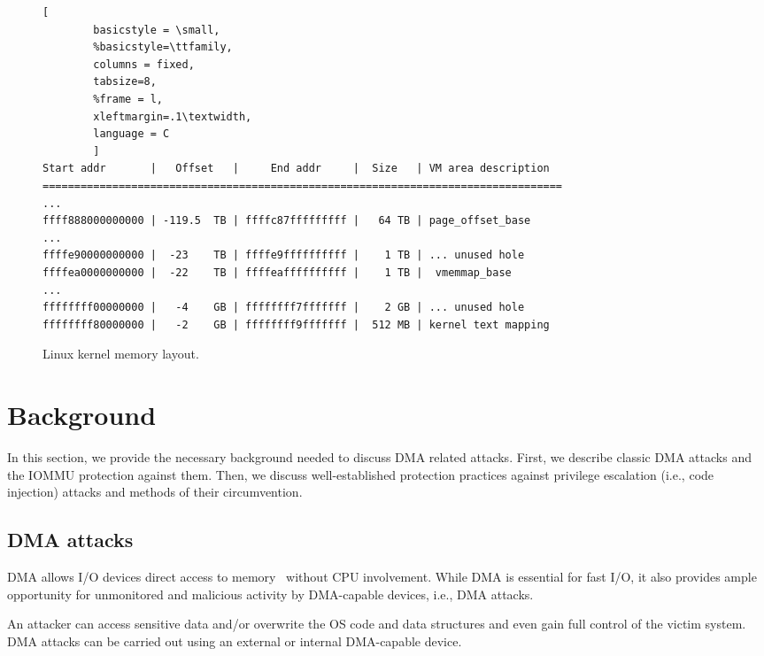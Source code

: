 \begin{figure*}[t]

        \begin{lstlisting}[
        basicstyle = \small,
        %basicstyle=\ttfamily,
        columns = fixed,
        tabsize=8,
        %frame = l,
        xleftmargin=.1\textwidth,
        language = C
        ]
Start addr       |   Offset   |     End addr     |  Size   | VM area description
==================================================================================
...
ffff888000000000 | -119.5  TB | ffffc87fffffffff |   64 TB | page_offset_base
...
ffffe90000000000 |  -23    TB | ffffe9ffffffffff |    1 TB | ... unused hole
ffffea0000000000 |  -22    TB | ffffeaffffffffff |    1 TB |  vmemmap_base
...
ffffffff00000000 |   -4    GB | ffffffff7fffffff |    2 GB | ... unused hole
ffffffff80000000 |   -2    GB | ffffffff9fffffff |  512 MB | kernel text mapping
                \end{lstlisting}
        \caption{ Linux kernel memory layout.}
        \label{fig:mem_layot}

\end{figure*}

\section{Background}\label{sec:background}

In this section, we provide the necessary background needed to discuss DMA related attacks. First, we describe classic DMA attacks and the IOMMU protection against them. Then, we discuss well-established protection practices against privilege escalation (i.e., code injection) attacks and methods of their circumvention.

\subsection{DMA attacks}

DMA allows I/O devices direct access to memory~\cite{oC54} without CPU involvement. While DMA is essential for fast I/O, it also provides ample opportunity for unmonitored and malicious activity by DMA-capable devices, i.e., DMA attacks. 

An attacker can access sensitive data and/or overwrite the OS code and data structures and even gain full control of the victim system. DMA attacks can be carried out using an external or internal DMA-capable device. 

